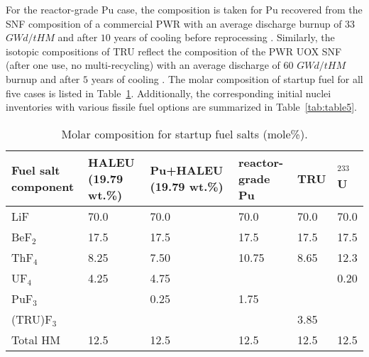 For the reactor-grade Pu case, the composition is taken for Pu 
recovered from the SNF composition of a commercial \gls{PWR} with an 
average discharge burnup of $33$ $GWd/tHM$ and after $10$ years of cooling before 
reprocessing \cite{oecd1989probabilistic,marka1993explosive}. Similarly, the 
isotopic compositions of \gls{TRU} reflect the composition of the \gls{PWR} UOX SNF 
(after one use, no multi-recycling) with an average discharge of $60$ 
$GWd/tHM$ burnup and after $5$ years of cooling \cite{de2000scenarios}. 
The molar composition of startup fuel for all five cases is listed in 
Table~\ref{tab:table4}. Additionally, the corresponding initial nuclei 
inventories with various fissile fuel options are summarized in 
Table~\ref{tab:table5}.
\begin{table}  %
	\caption{Molar composition for startup fuel salts (mole\%).}
	\vspace{0.1in}
	\begin{tabularx}{\textwidth}{p{} X p{} 
	p{} X X}
		\hline
		Fuel salt component& \gls{HALEU} (19.79 wt.\%) & Pu+\gls{HALEU} (19.79 wt.\%) 
		&  reactor-grade Pu & \gls{TRU}& $^{233}$U \\
		\hline
		LiF&70.0&70.0&70.0&70.0&70.0\\
		BeF$_2$&17.5&17.5&17.5&17.5&17.5\\
		ThF$_4$&8.25&7.50&10.75&	8.65&12.3		\\
		UF$_4$&4.25&4.75&&&	0.20		\\
		PuF$_3$&&0.25&1.75&&		\\
		(TRU)F$_3$&&&	&3.85	&\\
		\hline
		Total HM &12.5&12.5&12.5&12.5&12.5\\
		\hline
	\end{tabularx}
	\label{tab:table4}
\end{table}

